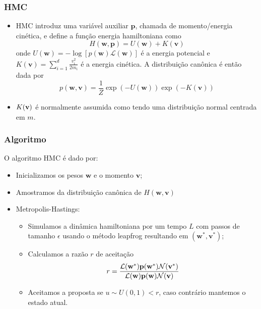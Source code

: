 \documentclass{beamer}
\begin{document}
\begin{frame}
    \frametitle{HMC}

    \begin{itemize}
        \item HMC introduz uma variável auxiliar $\mathbf{p}$, chamada de momento/energia cinética, e define a função energia hamiltoniana como
        $$ H(\mathbf{w}, \mathbf{p}) = U(\mathbf{w}) + K(\mathbf{v}) $$
        onde $U(\mathbf{w}) = -\log \left[ p(\mathbf{w}) \mathcal{L}(\mathbf{w}) \right]$ é a energia potencial e $K(\mathbf{v}) = \sum_{i=1}^{d}\frac{v_i^2}{2m_i}$ é a energia cinética. A distribuição canônica é então dada por
        $$ p(\mathbf{w}, \mathbf{v}) = \frac{1}{Z} \exp (-U(\mathbf{w})) \exp (-K(\mathbf{v})) $$
        \item $K(\bf{v})$ é normalmente assumida como tendo uma distribuição normal centrada em $m$.
    \end{itemize}

\end{frame}


\begin{frame}
    \frametitle{Algoritmo}

    O algoritmo HMC é dado por:
    \begin{itemize}
        \item Inicializamos os pesos $\mathbf{w}$ e o momento $\mathbf{v}$;
        \item Amostramos da distribuição canônica de $H(\mathbf{w}, \mathbf{v})$
        \item Metropolis-Hastings:
        \begin{itemize}
            \item Simulamos a dinâmica hamiltoniana por um tempo $L$ com passos de tamanho $\epsilon$ usando o método leapfrog resultando em $(\mathbf{w}^*, \mathbf{v}^*)$;
            \item Calculamos a razão $r$ de aceitação
            $$ r = \frac{\mathcal{L}(\bf{w}^*) p(\bf{w}^*) \mathcal{N}(\bf{v}^*)}{\mathcal{L}(\bf{w}) p(\bf{w}) \mathcal{N}(\bf{v})} $$
            \item Aceitamos a proposta se $u \sim U(0,1) < r$, caso contrário mantemos o estado atual.
        \end{itemize}
    \end{itemize}

\end{frame}
\end{document}
